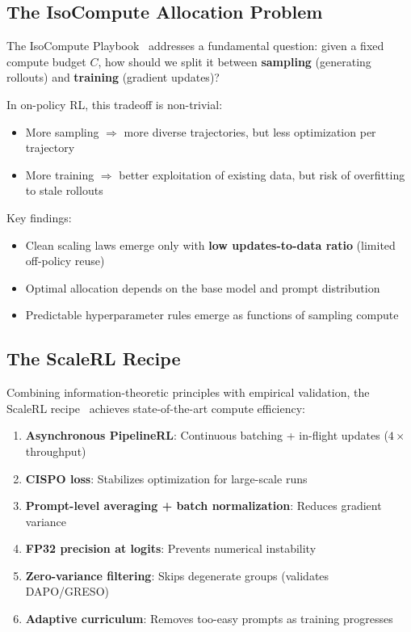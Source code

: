 \documentclass[11pt,a4paper]{article}
\theoremstyle{definition}
\theoremstyle{remark}
\begin{document}
\subsection{The IsoCompute Allocation Problem}

The IsoCompute Playbook~\cite{isocompute2025} addresses a fundamental question: given a fixed compute budget $C$, how should we split it between \textbf{sampling} (generating rollouts) and \textbf{training} (gradient updates)?

In on-policy RL, this tradeoff is non-trivial:
\begin{itemize}
    \item More sampling $\Rightarrow$ more diverse trajectories, but less optimization per trajectory
    \item More training $\Rightarrow$ better exploitation of existing data, but risk of overfitting to stale rollouts
\end{itemize}

Key findings:
\begin{itemize}
    \item Clean scaling laws emerge only with \textbf{low updates-to-data ratio} (limited off-policy reuse)
    \item Optimal allocation depends on the base model and prompt distribution
    \item Predictable hyperparameter rules emerge as functions of sampling compute
\end{itemize}

\subsection{The ScaleRL Recipe}

Combining information-theoretic principles with empirical validation, the ScaleRL recipe~\cite{scalerl2025} achieves state-of-the-art compute efficiency:

\begin{enumerate}
    \item \textbf{Asynchronous PipelineRL}: Continuous batching + in-flight updates ($4\times$ throughput)
    \item \textbf{CISPO loss}: Stabilizes optimization for large-scale runs
    \item \textbf{Prompt-level averaging + batch normalization}: Reduces gradient variance
    \item \textbf{FP32 precision at logits}: Prevents numerical instability
    \item \textbf{Zero-variance filtering}: Skips degenerate groups (validates DAPO/GRESO)
    \item \textbf{Adaptive curriculum}: Removes too-easy prompts as training progresses
\end{enumerate}
\end{document}
